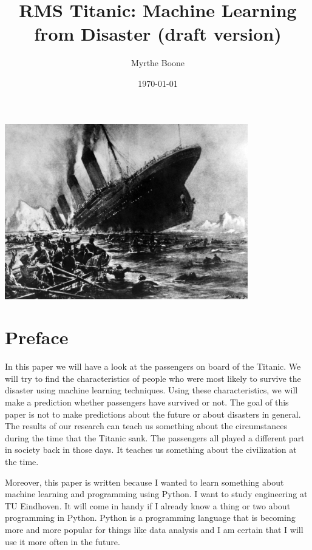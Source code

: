 \documentclass[11pt]{article}
\author{Myrthe Boone}
\date{\today}
\title{RMS Titanic: Machine Learning from Disaster (draft version)}
\begin{document}
\maketitle


\begin{center}
\includegraphics[width=400]{./titanicfrontpage.png}
\end{center}

\newpage
\section{Preface}
\label{sec:org360050f}
In this paper we will have a look at the passengers on board of the Titanic. We will try to find the characteristics of people who were most likely to survive the disaster using machine learning techniques. Using these characteristics, we will make a prediction whether passengers have survived or not. The goal of this paper is not to make predictions about the future or about disasters in general. The results of our research can teach us something about the circumstances during the time that the Titanic sank. The passengers all played a different part in society back in those days. It teaches us something about the civilization at the time. 

Moreover, this paper is written because I wanted to learn something about machine learning and programming using Python. I want to study engineering at TU Eindhoven. It will come in handy if I already know a thing or two about programming in Python. Python is a programming language that is becoming more and more popular for things like data analysis and I am certain that I will use it more often in the future.  
\end{document}
